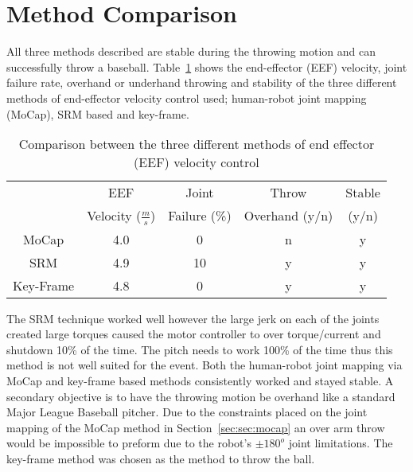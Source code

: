 \section{\bf Method Comparison}\label{sec:comparison}
All three methods described are stable during the throwing motion and can successfully throw a baseball.  Table~\ref{table:comp} shows the end-effector (EEF) velocity, joint failure rate, overhand or underhand throwing and stability of the three different methods of end-effector velocity control used; human-robot joint mapping (MoCap), SRM based and key-frame.

\begin{table}[!t]
\renewcommand{\arraystretch}{1.3}
\caption{ Comparison between the three different methods of end effector (EEF) velocity control}
\label{table:comp}
\centering
\begin{tabular}{|c|c|c|c|c|}
\hline
  				& EEF 																	& Joint 						& Throw						& Stable  			\\
  				& Velocity ($\frac{m}{s}$)							& Failure (\%)			& Overhand (y/n)	& (y/n)					\\
\hline	
MoCap 		& 4.0																		& 0									& n								& y 						\\
\hline
SRM 			& 4.9																		& 10								& y								& y							\\
\hline
Key-Frame & 4.8 																	& 0 								& y								&	y							\\
\hline
\end{tabular}
\end{table}

The SRM technique worked well however the large jerk on each of the joints created large torques caused the motor controller to over torque/current and shutdown 10\% of the time.  
The pitch needs to work 100\% of the time thus this method is not well suited for the event.  
Both the human-robot joint mapping via MoCap and key-frame based methods consistently worked and stayed stable.  A secondary objective is to have the throwing motion be overhand like a standard Major League Baseball pitcher.  
Due to the constraints placed on the joint mapping of the MoCap method in Section~\ref{sec:sec:mocap} an over arm throw would be impossible to preform due to the robot's $\pm180^o$ joint limitations.  The key-frame method was chosen as the method to throw the ball.  
